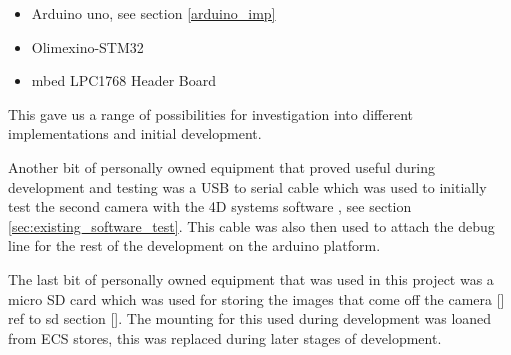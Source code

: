 \begin{itemize}
	\item Arduino uno, see section \ref{arduino_imp} \cite{arduino_serial_library}
	\item Olimexino-STM32
	\item mbed LPC1768 Header Board
\end{itemize}

This gave us a range of possibilities for investigation into different implementations and initial development.

Another bit of personally owned equipment that proved useful during development and testing was a USB to serial cable which was used to initially test the second camera with the 4D systems software \cite{ucam_test_software}, see section \ref{sec:existing_software_test}. This cable was also then used to attach the debug line for the rest of the development on the arduino platform.

The last bit of personally owned equipment that was used in this project was a micro SD card which was used for storing the images that come off the camera [] ref to sd section []. The mounting for this used during development was loaned from ECS stores, this was replaced during later stages of development.